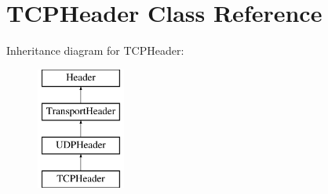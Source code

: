 \hypertarget{class_t_c_p_header}{\section{T\-C\-P\-Header Class Reference}
\label{class_t_c_p_header}
}
Inheritance diagram for T\-C\-P\-Header\-:\begin{figure}[H]
\begin{center}
\leavevmode
\includegraphics[height=4.000000cm]{class_t_c_p_header}
\end{center}
\end{figure}
